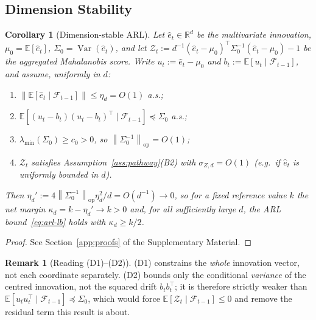 \documentclass[bj,authoryear]{imsart}
\theoremstyle{plain}
\newtheorem{corollary}[theorem]{Corollary}
\theoremstyle{definition}
\newtheorem{remark}{Remark}[section]
\newcommand{\E}{\mathbb{E}}
\newcommand{\R}{\mathbb{R}}
\newcommand{\F}{\mathcal{F}}
\newcommand{\norm}[1]{\left\lVert #1 \right\rVert}
\newcommand{\given}{\mid}
\DeclareMathOperator{\Var}{Var}
\begin{document}
\subsection{Dimension Stability}


\begin{corollary}[Dimension-stable ARL]
\label{cor:dim}
  Let $\hat e_t\in\R^d$ be the multivariate innovation, $\mu_0=\E[\hat e_t]$,
  $\Sigma_0=\Var(\hat e_t)$, and let
  $\mathcal Z_t:=d^{-1}(\hat e_t-\mu_0)^\top\Sigma_0^{-1}(\hat e_t-\mu_0)-1$
  be the aggregated Mahalanobis score.  Write $u_t:=\hat e_t-\mu_0$ and
  $b_t:=\E[u_t\given\F_{t-1}]$, and assume, uniformly in $d$:
  \begin{enumerate}[label=(D\arabic*), itemsep=2pt]
    \item $\norm{\E[\hat e_t\given\F_{t-1}]}\leq\eta_d=O(1)$ a.s.;
    \item $\E[(u_t-b_t)(u_t-b_t)^\top\given\F_{t-1}]\preceq\Sigma_0$ a.s.;
    \item $\lambda_{\min}(\Sigma_0)\geq c_0>0$, so
      $\norm{\Sigma_0^{-1}}_{\mathrm{op}}=O(1)$;
    \item $\mathcal Z_t$ satisfies Assumption~\ref{ass:pathway}(B2) with
      $\sigma_{Z,d}=O(1)$ (e.g.\ if $\hat e_t$ is uniformly bounded in $d$).
  \end{enumerate}
  Then $\eta_d':=4\norm{\Sigma_0^{-1}}_{\mathrm{op}}\eta_d^2/d=O(d^{-1})\to0$, so
  for a fixed reference value $k$ the net margin $\kappa_d=k-\eta_d'\to k>0$ and,
  for all sufficiently large $d$, the ARL bound~\eqref{eq:arl-lb} holds with
  $\kappa_d\geq k/2$.
\end{corollary}

\begin{proof}
  See Section~\ref{app:proofs} of the Supplementary Material.
\end{proof}

\begin{remark}[Reading (D1)--(D2)]
  (D1) constrains the \emph{whole} innovation vector, not each coordinate
  separately.  (D2) bounds only the conditional \emph{variance} of the centred
  innovation, not the squared drift $b_tb_t^\top$; it is therefore strictly
  weaker than $\E[u_tu_t^\top\given\F_{t-1}]\preceq\Sigma_0$, which would force
  $\E[\mathcal Z_t\given\F_{t-1}]\leq0$ and remove the residual term this result
  is about.
\end{remark}
\end{document}

